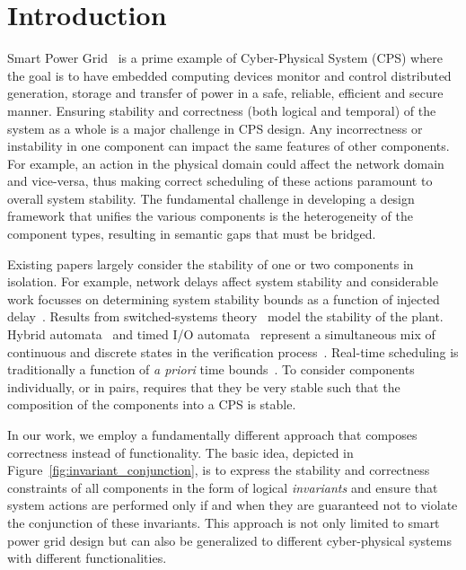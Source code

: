 \section{Introduction}
\label{sec:introduction}

Smart Power Grid~\cite{huang11} is a prime example of Cyber-Physical System 
(CPS) where the goal is to have embedded computing devices monitor and control 
distributed generation, storage and transfer of power in a safe, reliable, 
efficient and secure manner. Ensuring stability and correctness (both logical and temporal)
of the system as a whole is a major challenge in CPS design. Any incorrectness or 
instability in one component can impact the same features of other components. 
For example, an action in the physical domain could affect the network domain and 
vice-versa, thus making correct scheduling of these actions paramount to overall system
stability. The fundamental challenge in developing a design framework that
unifies the various components is the heterogeneity of the component types,
resulting in semantic gaps that must be bridged. 

Existing papers largely consider the stability of one or two components in
isolation. For example, network delays affect system stability and considerable
work focusses on determining system stability bounds as a function of injected
delay~\cite{hespanha07}. Results from switched-systems theory~\cite{donkers11}
model the stability of the plant. Hybrid automata~\cite{henzinger96} and timed
I/O automata~\cite{alur94} represent a simultaneous mix of continuous and
discrete states in the verification process~\cite{chutinan03,tomlin03}.
Real-time scheduling is traditionally a function of \emph{a priori} time
bounds~\cite{liu00}. To consider components individually, or in pairs, requires
that they be very stable such that the composition of the components into a CPS
is stable.

In our work, we employ a fundamentally different approach that composes
correctness instead of functionality. The basic idea, depicted in
Figure~\ref{fig:invariant_conjunction}, is to express the stability and
correctness constraints of all components in the form of logical {\em invariants} 
and ensure that system actions are performed only if and when they are guaranteed not 
to violate the conjunction of these invariants. This approach is not only limited
to smart power grid design but can also be generalized to different cyber-physical systems 
with different functionalities. 


